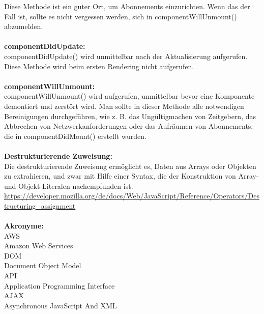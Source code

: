 Diese Methode ist ein guter Ort, um Abonnements einzurichten. Wenn das der Fall ist, sollte es nicht vergessen werden, sich in componentWillUnmount() abzumelden.
\\\\
\textbf{componentDidUpdate:}\\
componentDidUpdate() wird unmittelbar nach der Aktualisierung aufgerufen. Diese Methode wird beim ersten Rendering nicht aufgerufen.
\\\\
\textbf{componentWillUnmount:}\\
componentWillUnmount() wird aufgerufen, unmittelbar bevor eine Komponente demontiert und zerstört wird. Man sollte in dieser Methode alle notwendigen Bereinigungen durchgeführen, wie z. B. das Ungültigmachen von Zeitgebern, das Abbrechen von Netzwerkanforderungen oder das Aufräumen von Abonnements, die in componentDidMount() erstellt wurden.
\\\\
\textbf{Destrukturierende Zuweisung:}\\
Die destrukturierende Zuweisung ermöglicht es, Daten aus Arrays oder Objekten zu extrahieren, und zwar mit Hilfe einer Syntax, die der Konstruktion von Array- und Objekt-Literalen nachempfunden ist.
\url{https://developer.mozilla.org/de/docs/Web/JavaScript/Reference/Operators/Destructuring_assignment}
\\\\
\textbf{Akronyme:}\\
{AWS}\\{Amazon Web Services}\\
{DOM}\\{Document Object Model}\\
{API}\\{Application Programming Interface}\\
{AJAX}\\{Asynchronous JavaScript And XML}\\

